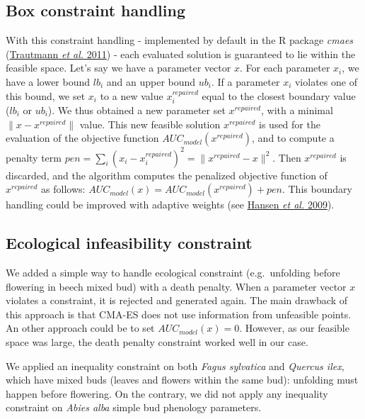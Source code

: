 \documentclass[11pt,]{article}
\begin{document}
\hypertarget{box-constraint-handling}{%
\subsection{Box constraint handling}\label{box-constraint-handling}}

With this constraint handling - implemented by default in the R package
\emph{cmaes} (\protect\hyperlink{ref-Trautmann2011}{Trautmann \emph{et
al.} 2011}) - each evaluated solution is guaranteed to lie within the
feasible space. Let's say we have a parameter vector \(x\). For each
parameter \(x_i\), we have a lower bound \(lb_i\) and an upper bound
\(ub_i\). If a parameter \(x_i\) violates one of this bound, we set
\(x_i\) to a new value \(x_i^{repaired}\) equal to the closest boundary
value (\(lb_i\) or \(ub_i\)). We thus obtained a new parameter set
\(x^{repaired}\), with a minimal \(\|x-x^{repaired}\|\) value. This new
feasible solution \(x^{repaired}\) is used for the evaluation of the
objective function \(AUC_{model}(x^{repaired})\), and to compute a
penalty term
\(pen=\sum\limits_{i}(x_i-x_i^{repaired})^2=\|x^{repaired}-x\|^2\). Then
\(x^{repaired}\) is discarded, and the algorithm computes the penalized
objective function of \(x^{repaired}\) as follows:
\(AUC_{model}(x)=AUC_{model}(x^{repaired})+pen\). This boundary handling
could be improved with adaptive weights (see
\protect\hyperlink{ref-Hansen2009}{Hansen \emph{et al.} 2009}).

\hypertarget{ecological-infeasibility-constraint}{%
\subsection{Ecological infeasibility
constraint}\label{ecological-infeasibility-constraint}}

We added a simple way to handle ecological constraint (e.g.~unfolding
before flowering in beech mixed bud) with a death penalty. When a
parameter vector \(x\) violates a constraint, it is rejected and
generated again. The main drawback of this approach is that CMA-ES does
not use information from unfeasible points. An other approach could be
to set \(AUC_{model}(x)=0\). However, as our feasible space was large,
the death penalty constraint worked well in our case.

We applied an inequality constraint on both \textit{Fagus sylvatica} and
\textit{Quercus ilex}, which have mixed buds (leaves and flowers within
the same bud): unfolding must happen before flowering. On the contrary,
we did not apply any inequality constraint on \textit{Abies alba} simple
bud phenology parameters.
\end{document}
